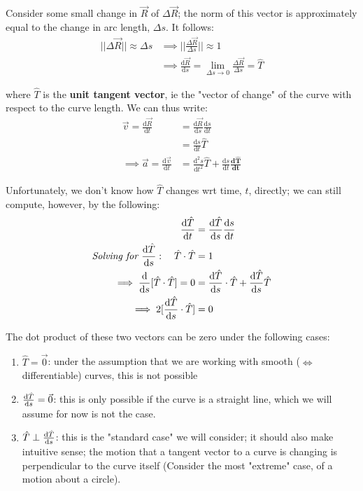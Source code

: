 \documentclass[12pt]{article}
\begin{document}
{Consider some small change in $\vec{R}$ of $\Delta \vec{R}$; the norm of this vector is approximately equal to the change in arc length, $\Delta s$. It follows: \begin{align*}
    ||\Delta \vec{R}|| \approx \Delta s &\implies ||\frac{\Delta \vec{R}}{\Delta s}|| \approx 1\\
    &\implies \frac{\text{d}\vec{R}}{\text{d}s} = \lim_{\Delta s \to 0} \frac{\Delta \vec{R}}{\Delta s} = \hat{T}
\end{align*}

where $\hat{T}$ is the \textbf{unit tangent vector}, ie the "vector of change" of the curve with respect to the curve length. We can thus write: \begin{align*}
    \vec{v} = \frac{\text{d} \vec{R}}{\text{d}t} &= \frac{\text{d}\vec{R}}{\text{d}s}\frac{\text{d}s}{\text{d}t}\\
    &= \frac{\text{d}s}{\text{d}t} \hat{T}\\
    \implies \vec{a} = \frac{\text{d}\vec{v}}{\text{d}t} &= \frac{\text{d}^2 s}{\text{d}t^2} \hat{T} + \frac{\text{d}s}{\text{d}t} \mathbf{\frac{\textbf{d}\hat{T}}{\textbf{d}t}}
\end{align*}

Unfortunately, we don't know how $\hat{T}$ changes wrt time, $t$, directly; we can still compute, however, by the following: \begin{align*}
    \frac{\text{d}\hat{T}}{\text{d}t} &= \frac{\text{d}\hat{T}}{\text{d}s} \frac{\text{d}s}{\text{d}t}\\
    \textit{Solving for } \frac{\text{d}\hat{T}}{\text{d}s}: \quad \hat{T} \cdot \hat{T} &= 1\\
    \implies \frac{\text{d}}{\text{d}s}[ \hat{T} \cdot \hat{T}] = 0 &= \frac{\text{d}\hat{T}}{\text{d}s}\cdot \hat{T} + \frac{\text{d}\hat{T}}{\text{d}s}\hat{T}\\
    \implies 2[\frac{\text{d}\hat{T}}{\text{d}s}\cdot \hat{T}] &= 0\\
\end{align*}

The dot product of these two vectors can be zero under the following cases:
\begin{enumerate}
    \item $\hat{T} = \vec{0}$: under the assumption that we are working with smooth ($\iff$ differentiable) curves, this is not possible
    \item $\frac{\text{d}\hat{T}}{\text{d}s} = \vec{0}$: this is only possible if the curve is a straight line, which we will assume for now is not the case. %
    \item $\hat{T} \perp \frac{\text{d}\hat{T}}{\text{d}s}$: this is the "standard case" we will consider; it should also make intuitive sense; the motion that a tangent vector to a curve is changing is perpendicular to the curve itself (Consider the most "extreme" case, of a motion about a circle).
\end{enumerate}

}
\end{document}
